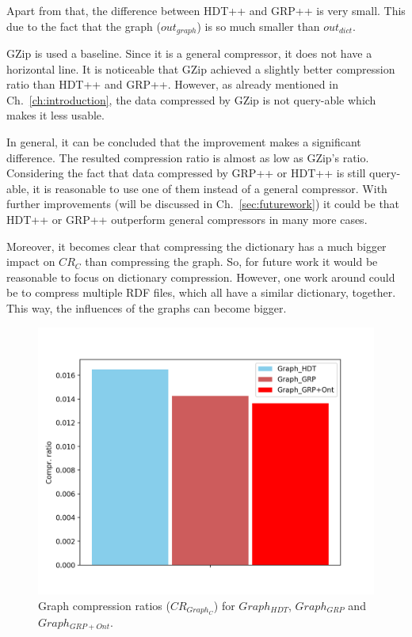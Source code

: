 Apart from that, the difference between HDT++ and GRP++ is very small. This due to the fact that the graph ($out_{graph}$) is so much smaller than $out_{dict}$.

GZip is used a baseline. Since it is a general compressor, it does not have a horizontal line. It is noticeable that GZip achieved a slightly better compression ratio than HDT++ and GRP++. However, as already mentioned in Ch.~\ref{ch:introduction}, the data compressed by GZip is not query-able which makes it less usable.

In general, it can be concluded that the improvement makes a significant difference. The resulted compression ratio is almost as low as GZip's ratio. Considering the fact that data compressed by GRP++ or HDT++ is still query-able, it is reasonable to use one of them instead of a general compressor. With further improvements (will be discussed in Ch.~\ref{sec:futurework}) it could be that HDT++ or GRP++ outperform general compressors in many more cases.

Moreover, it becomes clear that compressing the dictionary has a much bigger impact on $CR_C$ than compressing the graph. So, for future work it would be reasonable to focus on dictionary compression. However, one work around could be to compress multiple RDF files, which all have a similar dictionary, together. This way, the influences of the graphs can become bigger.


\begin{figure}
	\centering
	\includegraphics[width=0.8\linewidth]{figures/4_evaluation/final/graphcompr}
	\caption{Graph compression ratios ($CR_{Graph_C}$) for $Graph_{HDT}$, $Graph_{GRP}$ and $Graph_{GRP+Ont}$.}
	\label{fig:graphcompr}
\end{figure}



